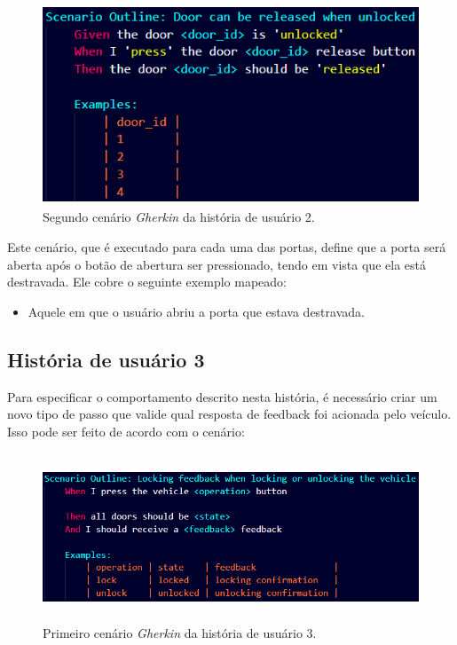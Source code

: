 \begin{figure}[H]
\centering
\includegraphics[height=6cm]{figuras/cenarios/h2c2.png}
\caption{Segundo cenário \textit{Gherkin} da história de usuário 2.}
\label{fig:h2c2}
\end{figure}

Este cenário, que é executado para cada uma das portas, define que a porta será aberta após o botão de abertura ser pressionado, tendo em vista que ela 
está destravada. Ele cobre o seguinte exemplo mapeado:

\begin{itemize}
    \item Aquele em que o usuário abriu a porta que estava destravada.
\end{itemize}


\subsection{História de usuário 3}

Para especificar o comportamento descrito nesta história, é necessário criar um novo tipo de passo que valide qual resposta de feedback foi acionada pelo veículo. 
Isso pode ser feito de acordo com o cenário:




\begin{figure}[H]
\centering
\includegraphics[height=5cm]{figuras/cenarios/h3c1.png}
\caption{Primeiro cenário \textit{Gherkin} da história de usuário 3.}
\label{fig:h3c1}
\end{figure}

